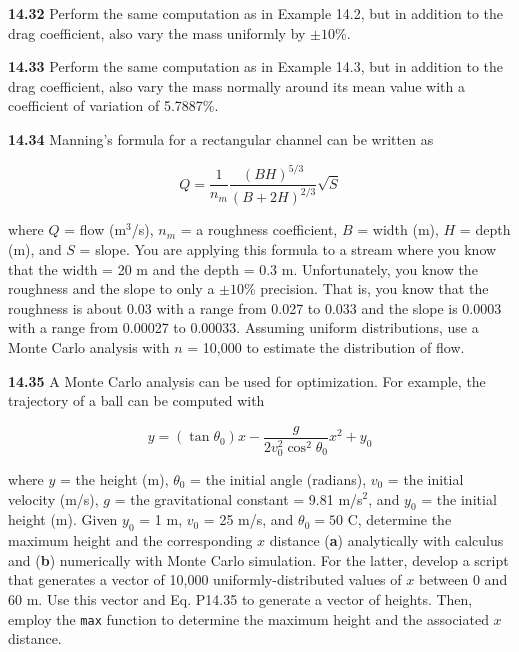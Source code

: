 \documentclass[../main.tex]{subfiles}
\begin{document}
\begin{multicols}{2}
	\noindent\textbf{14.32} Perform the same computation as in Example 14.2,
	but in addition to the drag coefficient, also vary the mass
	uniformly by $\pm 10\%$.

	\noindent\textbf{14.33} Perform the same computation as in Example 14.3,
	but in addition to the drag coefficient, also vary the mass
	normally around its mean value with a coefficient of variation of 5.7887\%.

	\noindent\textbf{14.34}  Manning's formula for a rectangular channel can be
	written as

	$$Q = \frac{1}{n_m} \frac{(BH) ^ {5/3}}{(B+2H) ^ {2/3}} \sqrt{S}$$

	\noindent where $Q$ = flow (m$^3$/s), $n_m$ = a roughness coefficient, $B$ =
	width (m), $H$ = depth (m), and $S$ = slope. You are applying
	this formula to a stream where you know that the width = 20 m
	and the depth = 0.3 m. Unfortunately, you know the roughness and the slope to only a $\pm 10\%$ precision. That is, you
	know that the roughness is about 0.03 with a range from 0.027
	to 0.033 and the slope is 0.0003 with a range from 0.00027
	to 0.00033. Assuming uniform distributions, use a Monte
	Carlo analysis with $n$ = 10,000 to estimate the distribution
	of flow.

	\noindent\textbf{14.35} A Monte Carlo analysis can be used for optimization.
	For example, the trajectory of a ball can be computed with

	\begin{equation}
		\tag{P14.35}
		y = (\tan \theta_0)x - \frac{g}{2 v^2_0 \cos ^2 \theta_0} x^2 + y_0
	\end{equation}

	\noindent where $y$ = the height (m), $\theta_0$ = the initial angle (radians),
	$v_0$ = the initial velocity (m/s), $g$ = the gravitational constant =
	9.81 m/s$^2$, and $y_0$ = the initial height (m). Given $y_0$ = 1 m,
	$v_0$ = 25 m/s, and $\theta_0 = 50$ \textdegree C, determine the maximum height
	and the corresponding $x$ distance (\textbf{a}) analytically with calculus and (\textbf{b}) numerically with Monte Carlo simulation. For
	the latter, develop a script that generates a vector of 10,000
	uniformly-distributed values of $x$ between 0 and 60 m. Use
	this vector and Eq. P14.35 to generate a vector of heights.
	Then, employ the \texttt{max} function to determine the maximum
	height and the associated $x$ distance.
\end{multicols}
\end{document}
